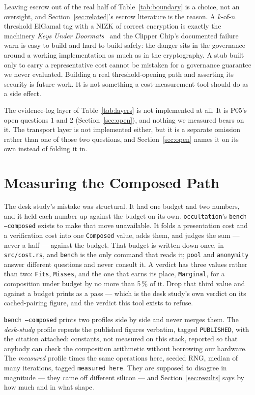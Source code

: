 \documentclass[11pt]{article}
\newcommand{\occultation}{\texttt{occultation}}
\begin{document}
Leaving escrow out of the real half of Table~\ref{tab:boundary} is a choice,
not an oversight, and Section~\ref{sec:related}'s escrow literature is the
reason. A $k$-of-$n$ threshold ElGamal tag with a NIZK of correct encryption
is exactly the machinery \emph{Keys Under Doormats}~\cite{keysunderdoormats}
and the Clipper Chip's documented failure~\cite{clipperchip} warn is easy to
build and hard to build safely: the danger sits in the governance around a
working implementation as much as in the cryptography. A stub built only to
carry a representative cost cannot be mistaken for a governance guarantee we
never evaluated. Building a real threshold-opening path and asserting its
security is future work. It is not something a cost-measurement tool should
do as a side effect.

The evidence-log layer of Table~\ref{tab:layers} is not implemented at all.
It is P05's open questions 1 and 2 (Section~\ref{sec:open}), and nothing we
measured bears on it. The transport layer is not implemented either, but it
is a separate omission rather than one of those two questions, and
Section~\ref{sec:open} names it on its own instead of folding it in.

\section{Measuring the Composed Path}
\label{sec:method}

The desk study's mistake was structural. It had one budget and two numbers,
and it held each number up against the budget on its own.
\occultation{}'s \texttt{bench --composed} exists to make that move
unavailable. It folds a presentation cost and a verification cost into one
\texttt{Composed} value, adds them, and judges the sum --- never a half ---
against the \deskbudget{} budget. That budget is written down once, in
\texttt{src/cost.rs}, and \texttt{bench} is the only command that reads it;
\texttt{pool} and \texttt{anonymity} answer different questions and never
consult it. A verdict has three values rather than two: \texttt{Fits},
\texttt{Misses}, and the one that earns its place, \texttt{Marginal}, for a
composition under budget by no more than 5\,\% of it. Drop that third value
and \desktotalcached{} against a \deskbudget{} budget prints as a pass ---
which is the desk study's own verdict on its cached-pairing figure, and the
verdict this tool exists to refuse.

\texttt{bench --composed} prints two profiles side by side and never merges
them. The \emph{desk-study} profile repeats the published figures verbatim,
tagged \texttt{PUBLISHED}, with the citation attached: constants, not
measured on this stack, reported so that anybody can check the composition
arithmetic without borrowing our hardware. The \emph{measured} profile times
the same operations here, seeded RNG, median of many iterations, tagged
\texttt{measured here}. They are supposed to disagree in magnitude --- they
came off different silicon --- and Section~\ref{sec:results} says by how
much and in what shape.
\end{document}

